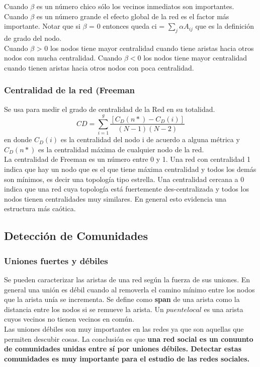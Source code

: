 \documentclass[titlepage,a4paper]{article}
\begin{document}
Cuando $\beta$ es un número chico sólo los vecinos inmediatos son importantes. Cuando $\beta$ es un número grande el efecto global de la red es el factor más importante. Notar que si $\beta$ = 0 entonces queda ci = $\sum_j \alpha A_{ij} $ que es la definición de grado del nodo. \\

Cuando $\beta$ > 0 los nodos tiene mayor centralidad cuando tiene aristas hacia otros nodos con mucha centralidad. Cuando $\beta <0$ los nodos tiene mayor centralidad cuando tienen aristas hacia otros nodos con poca centralidad. 

\subsubsection*{Centralidad de la red (Freeman}
Se usa para medir el grado de centralidad de la Red en su totalidad. $$CD = \sum_{i=1}^g\frac{[C_D(n*) - C_D(i)]}{(N-1)(N-2)} $$ en donde $C_D(i)$ es la centralidad del nodo i de acuerdo a alguna métrica y $C_D(n*)$ es la centralidad máxima de cualquier nodo de la red. \\

La centralidad de Freeman es un número entre 0 y 1. Una red con centralidad 1 indica que hay un nodo que es el que tiene máxima centralidad y todos los demás son mínimos, es decir una topología tipo estrella. Una centralidad cercana a 0 indica que una red cuya topología está fuertemente des-centralizada y todos los nodos tienen centralidades muy similares. En general esto evidencia una estructura más caótica. \\

\subsection*{Detección de Comunidades}
\subsubsection*{Uniones fuertes y débiles}
Se pueden caracterizar las aristas de una red según la fuerza de sus uniones. En general una unión es débil cuando al removerla el camino mínimo entre los nodos que la arista unía se incrementa. Se define como \textbf{span} de una arista como la distancia entre los nodos si se remueve la arista. Un $puente local$ es una arista cuyos vecinos no tienen vecinos en común. \\

Las uniones débiles son muy importantes en las redes ya que son aquellas que permiten descubir cosas. La conclusión es que \textbf{una red social es un conuunto de comunidades unidas entre sí por uniones débiles. Detectar estas comunidades es muy importante para el estudio de las redes sociales. }
\end{document}
